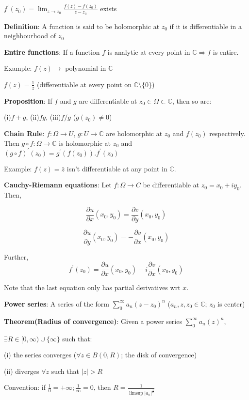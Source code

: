 \documentclass{article}
\begin{document}
\begin{flushleft}
$f^{'}(z_0)= \lim_{z \to z_0} \frac{f(z)-f(z_0)}{z-z_0}$ exists 

\textbf{Definition}: A function is said to be holomorphic at $z_0$ if it is differentiable in a neighbourhood of $z_0$

\textbf{Entire functions}: If a function $f$ is analytic at every point in $\mathds{C}\Rightarrow f$ is entire.

Example: $f(z)\rightarrow$ polynomial in $\mathds{C}$ 

$f(z)=\frac{1}{z}$ (differentiable at every point on $\mathds{C}\setminus \{0\}$)

\textbf{Proposition}: If $f$ and $g$ are differentiable at $z_0\in \Omega \subset \mathds{C}$, then so are:

(i)$f+g$, (ii)$fg$, (iii)$f/g$ ($g(z_0)\neq 0$)

\textbf{Chain Rule}: $f:\Omega \rightarrow U$, $g:U\rightarrow \mathds{C}$ are holomorphic at $z_0$ and $f(z_0)$ respectively.
Then $g\circ f:\Omega\rightarrow \mathds{C}$ is holomorphic at $z_0$ and $(g\circ f)^{'}(z_0)=g^{'}(f(z_0)).f^{'}(z_0)$

Example: $f(z)=\bar{z}$ isn't differentiable at any point in $\mathds{C}$.

\textbf{Cauchy-Riemann equations}: Let $f:\Omega \rightarrow C$ be differentiable at $z_0=x_0+iy_0$. Then,

$$\frac{\partial u}{\partial x}(x_0,y_0)=\frac{\partial v}{\partial y}(x_0,y_0)$$

$$\frac{\partial u}{\partial y}(x_0,y_0)= -\frac{\partial v}{\partial x}(x_0,y_0)$$

Further, $$f^{'}(z_0)= \frac{\partial u}{\partial x}(x_0,y_0)+i\frac{\partial v}{\partial x}(x_0,y_0)$$

Note that the last equation only has partial derivatives wrt $x$.

\textbf{Power series}: A series of the form $\sum_{0}^{\infty} a_n(z-z_0)^n$ ($a_n,z,z_0\in \mathds{C}$; $z_0$ is center)

\textbf{Theorem(Radius of convergence)}: Given a power series $\sum_{0}^{\infty} a_n(z)^n$,

$\exists R\in [0,\infty) \cup \{\infty\}$ such that:

(i) the series converges ($\forall z\in B(0,R)$; the disk of convergence)

(ii) diverges $\forall z$ such that $|z|>R$ 

Convention: if $\frac{1}{0}=+\infty ; \frac{1}{\infty}=0$, then $R=\frac{1}{\limsup |a_n|^{\frac{1}{n}}}$


\end{flushleft}
\end{document}
